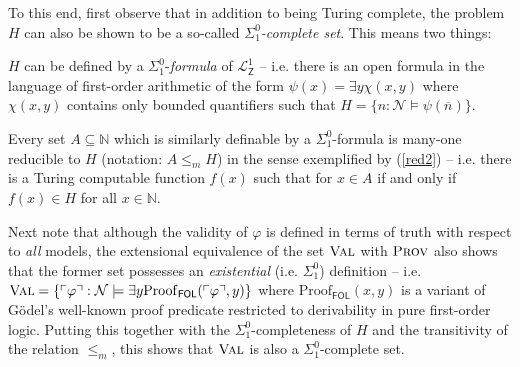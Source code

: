 \documentclass[11pt,fleqn,leqno]{article}
\def\phi{\varphi}
\def\E{\exists}
\begin{document}
To this end, first observe that in addition to being Turing complete, the problem $H$ can also be shown to be a so-called \textsl{$\Sigma^0_1$-complete set}.  This means two things:
\begin{example}
\label{sigma01}
\begin{compactenum}[i)]
\item $H$ can be defined by a $\Sigma^0_1$-\textsl{formula} of  $\mathcal{L}^1_{\mathsf{Z}}$ -- i.e. there is an open formula in the language of first-order arithmetic of the form $\psi(x) = \E y \chi(x,y)$ where $\chi(x,y)$ contains only bounded quantifiers such that  $H = \{n : \mathcal{N} \models \psi(\overline{n})\}$.
\item Every set $A \subseteq \mathbb{N}$ which is similarly definable by a $\Sigma^0_1$-formula is many-one reducible to $H$ (notation: $A \leq_m H$) in the sense exemplified by (\ref{red2}) -- i.e. there is a Turing computable function $f(x)$ such that for $x \in A$ if and only if $f(x) \in H$ for all $x \in \mathbb{N}$.
\end{compactenum}
\end{example}
Next note that although the validity of $\phi$ is defined in terms of truth with respect to \textsl{all} models, the extensional equivalence of the set $\textsc{Val}$ with $\textsc{Prov}$ also shows that the former set possesses an \textsl{existential} (i.e. $\Sigma^0_1$) definition -- i.e. $\textsc{Val} = \{\ulcorner \phi \urcorner : \mathcal{N} \models \E y \mathrm{Proof}_{\mathsf{FOL}}(\ulcorner \phi \urcorner,y)\}$ where $\mathrm{Proof}_{\mathsf{FOL}}(x,y)$ is a variant of G\"odel's well-known proof predicate restricted to derivability in pure first-order logic.   Putting this together with the $\Sigma^0_1$-completeness of $H$ and the transitivity of the relation $\leq_m$, this shows that $\textsc{Val}$ is also a $\Sigma^0_1$-complete set.
\end{document}
